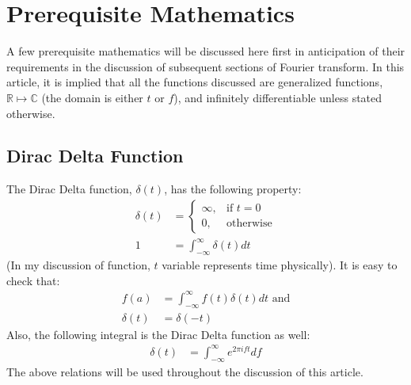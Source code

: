 \documentclass[letterpaper, 11pt]{article}
\newcommand{\fint}{\int_{-\infty}^{\infty}} %
\newcommand{\ift}[3]{\fint #2 e^{2\pi i#1#3} d#1} %
\numberwithin{equation}{section}
\numberwithin{figure}{section}
\begin{document}
\section{Prerequisite Mathematics}
A few prerequisite mathematics will be discussed here first in anticipation of their requirements in the discussion of subsequent sections of Fourier transform. In this article, it is implied that all the functions discussed are generalized functions, \(\mathbb{R} \mapsto \mathbb{C} \) (the domain is either \(t\) or \(f\)), and infinitely differentiable unless stated otherwise.  

\subsection{Dirac Delta Function}
The Dirac Delta function, \(\delta (t)\), has the following property:
\begin{align}
	\delta (t)	&=\begin{cases}
		\infty, & \text{if } t = 0 \\
		0,	& \text{otherwise}
	\end{cases}\\
		1	&= \fint \delta (t) dt
\end{align}
(In my discussion of function, \(t\) variable represents time physically). It is easy to check that:
\begin{align}
	f(a)		&= \fint f(t) \delta (t) dt \text{ and}\\
	\delta (t)	&= \delta (-t)
\end{align}
Also, the following integral is the Dirac Delta function as well:
\begin{align}
	\delta (t)	&= \ift{f}{}{t}
	\label{eq:dirac}
\end{align}
The above relations will be used throughout the discussion of this article.

\end{document}

